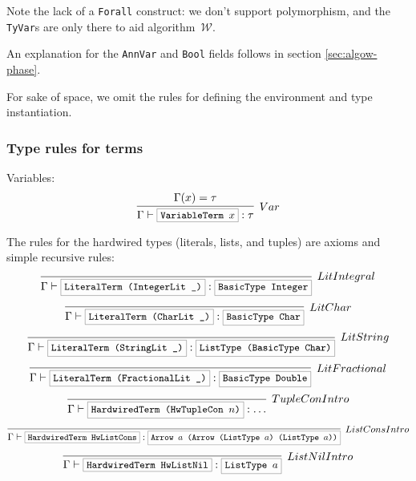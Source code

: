 \documentclass[a4paper]{scrartcl}
\newcommand{\hsterm}[1]{%
    \setlength{\fboxsep}{3pt}%
    \setlength{\fboxrule}{0.2pt}%
    \fbox{\texttt{\small #1}}}
\newcommand{\algow}{algorithm~$\mathcal{W}$}
\begin{document}
Note the lack of a \texttt{Forall} construct: we don't support polymorphism,
and the \texttt{TyVar}s are only there to aid \algow{}.

An explanation for the \texttt{AnnVar} and \texttt{Bool} fields follows in
section \ref{sec:algow-phase}.

For sake of space, we omit the rules for defining the environment and
type instantiation.

\subsubsection{Type rules for terms}
Variables:
\begin{equation*}
\infer[Var]%
    {\Gamma \vdash \hsterm{VariableTerm \ensuremath{x}} : \tau}
    {\Gamma(x) = \tau}
\end{equation*}

The rules for the hardwired types (literals, lists, and tuples) are axioms
and simple recursive rules:
\begin{equation*}
\infer[LitIntegral]%
    {\Gamma \vdash \hsterm{LiteralTerm (IntegerLit \_)} : \hsterm{BasicType Integer}}%
    {}
\end{equation*}\begin{equation*}
\infer[LitChar]%
    {\Gamma \vdash \hsterm{LiteralTerm (CharLit \_)} : \hsterm{BasicType Char}}%
    {}
\end{equation*}\begin{equation*}
\infer[LitString]%
    {\Gamma \vdash \hsterm{LiteralTerm (StringLit \_)} : \hsterm{ListType (BasicType Char)}}%
    {}
\end{equation*}\begin{equation*}
\infer[LitFractional]%
    {\Gamma \vdash \hsterm{LiteralTerm (FractionalLit \_)} : \hsterm{BasicType Double}}%
    {}
\end{equation*}\begin{equation*}
\infer[TupleConIntro]%
    {\Gamma \vdash \hsterm{HardwiredTerm (HwTupleCon \ensuremath{n})} : \ldots}%
    {}
\end{equation*}\begin{equation*}
\infer[ListConsIntro]%
    {\Gamma \vdash \hsterm{HardwiredTerm HwListCons} : \hsterm{Arrow \ensuremath{a} (Arrow (ListType \ensuremath{a}) (ListType \ensuremath{a}))}}%
    {}
\end{equation*}\begin{equation*}
\infer[ListNilIntro]%
    {\Gamma \vdash \hsterm{HardwiredTerm HwListNil} : \hsterm{ListType \ensuremath{a}}}%
    {}
\end{equation*}
\end{document}
